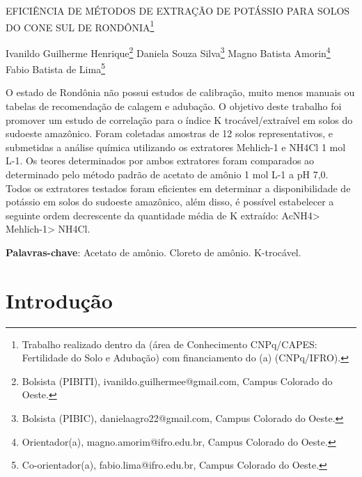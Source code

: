 \documentclass[article,12pt,onesidea,4paper,english,brazil]{abntex2}
\begin{document}
	
	
	\frenchspacing 
	
	\begin{center}
		\LARGE EFICIÊNCIA DE MÉTODOS DE EXTRAÇÃO DE POTÁSSIO PARA SOLOS DO CONE SUL DE RONDÔNIA\footnote{Trabalho realizado dentro da (área de Conhecimento CNPq/CAPES: Fertilidade do Solo e Adubação) com financiamento do (a) (CNPq/IFRO).}
		
		\normalsize
		Ivanildo Guilherme Henrique\footnote{Bolsista (PIBITI), ivanildo.guilhermee@gmail.com, Campus Colorado do Oeste.} 
		Daniela Souza Silva\footnote{Bolsista (PIBIC), danielaagro22@gmail.com, Campus Colorado do Oeste.} 
		Magno Batista Amorin\footnote{Orientador(a), magno.amorim@ifro.edu.br, Campus Colorado do Oeste.} 
		Fabio Batista de Lima\footnote{Co-orientador(a), fabio.lima@ifro.edu.br, Campus Colorado do Oeste.} 
	\end{center}
	
	\begin{resumoumacoluna}
		O estado de Rondônia não possui estudos de calibração, muito menos manuais ou tabelas de recomendação de calagem e adubação. O objetivo deste trabalho foi promover um estudo de correlação para o índice K trocável/extraível em solos do sudoeste amazônico. Foram coletadas amostras de 12 solos representativos, e submetidas a análise química utilizando os extratores Mehlich-1 e NH4Cl 1 mol L-1. Os teores determinados por ambos extratores foram comparados ao determinado pelo método padrão de acetato de amônio 1 mol L-1 a pH 7,0. Todos os extratores testados foram eficientes em determinar a disponibilidade de potássio em solos do sudoeste amazônico, além disso, é possível estabelecer a seguinte ordem decrescente da quantidade média de K extraído: AcNH4> Mehlich-1> NH4Cl.
		
		\vspace{\onelineskip}
		
		\noindent
		\textbf{Palavras-chave}: Acetato de amônio. Cloreto de amônio. K-trocável. 
	\end{resumoumacoluna}
	
	\section*{Introdução}
	
\end{document}
